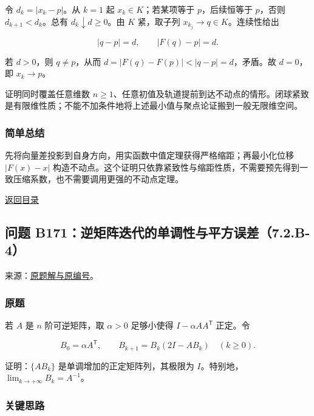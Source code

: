 \documentclass[11pt,a4paper]{article}
\begin{document}
令 \(d_k=|x_k-p|\)。从 \(k=1\) 起 \(x_k\in K\)；若某项等于
\(p\)，后续恒等于 \(p\)，否则 \(d_{k+1}<d_k\)。总有
\(d_k\downarrow d\ge0\)。由 \(K\) 紧，取子列
\(x_{k_j}\to q\in K\)。连续性给出

\[
|q-p|=d,\qquad |F(q)-p|=d.
\]

若 \(d>0\)，则 \(q\ne p\)，从而 \(d=|F(q)-F(p)|<|q-p|=d\)，矛盾。故
\(d=0\)，即 \(x_k\to p\)。

证明同时覆盖任意维数
\(n\ge1\)、任意初值及轨道提前到达不动点的情形。闭球紧致是有限维性质；不能不加条件地将上述最小值与聚点论证搬到一般无限维空间。

\subsubsection{简单总结}\label{ux7b80ux5355ux603bux7ed3-15}

先将向量差投影到自身方向，用实函数中值定理获得严格缩距；再最小化位移
\(|F(x)-x|\)
构造不动点。这个证明只依靠紧致性与缩距性质，不需要预先得到一致压缩系数，也不需要调用更强的不动点定理。

\noindent\hyperref[contents]{返回目录}

\subsection{问题
B171：逆矩阵迭代的单调性与平方误差（7.2.B-4）}\label{ux95eeux9898-b171ux9006ux77e9ux9635ux8fedux4ee3ux7684ux5355ux8c03ux6027ux4e0eux5e73ux65b9ux8befux5dee7.2.b-4}

来源：\href{https://zj139.github.io/math-notes/problems/f5ad6d5a3d50a93ac170639e/\#问题-b171}{原题解与原编号}。

\subsubsection{原题}\label{ux539fux9898-16}

若 \(A\) 是 \(n\) 阶可逆矩阵，取 \(\alpha>0\) 足够小使得
\(I-\alpha AA^{\mathsf T}\) 正定。令

\[
B_0=\alpha A^{\mathsf T},
\qquad B_{k+1}=B_k(2I-AB_k)\quad(k\ge0).
\]

证明：\(\{AB_k\}\) 是单调增加的正定矩阵列，其极限为
\(I\)。特别地，\(\lim_{k\to+\infty}B_k=A^{-1}\)。

\subsubsection{关键思路}\label{ux5173ux952eux601dux8def-16}
\end{document}
